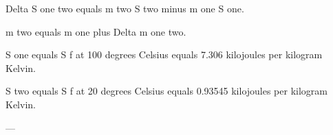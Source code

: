 Delta S one two equals m two S two minus m one S one.  

m two equals m one plus Delta m one two.  

S one equals S f at 100 degrees Celsius equals 7.306 kilojoules per kilogram Kelvin.  

S two equals S f at 20 degrees Celsius equals 0.93545 kilojoules per kilogram Kelvin.  

---